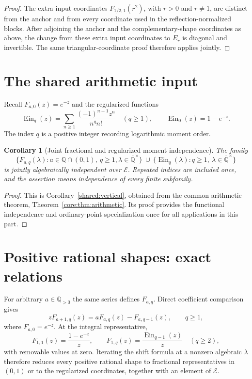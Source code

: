 \documentclass[11pt,a4paper]{article}
\newcommand{\Qbar}{\overline{\mathbb Q}}
\newcommand{\E}{\mathcal E}
\DeclareMathOperator{\Ein}{Ein}
\newtheorem{corollary}[theorem]{Corollary}
\theoremstyle{definition}
\theoremstyle{remark}
\numberwithin{equation}{section}
\begin{document}
\begin{proof}
The extra input coordinates \(F_{1/2,1}(r^2)\), with \(r>0\) and
\(r\ne1\), are distinct from the anchor and from every coordinate
used in the reflection-normalized blocks. After adjoining the anchor and
the complementary-shape coordinates as above, the change from these
extra input coordinates to \(E_r\) is diagonal and invertible.
The same triangular-coordinate proof therefore applies jointly.
\end{proof}



\section{The shared arithmetic input}\label{refl:sec:fractional-residue-proof}
Recall $F_{a,0}(z)=e^{-z}$ and the regularized functions
\[
 \Ein_q(z)=\sum_{n\ge1}\frac{(-1)^{n-1}z^n}{n^q n!}
 \quad(q\ge1),\qquad \Ein_0(z)=1-e^{-z}.
\]
The index $q$ is a positive integer recording logarithmic moment order.

\begin{corollary}[Joint fractional and regularized moment independence]
\label{refl:thm:joint-fractional-regularized}
The family
\[
 \{F_{a,q}(\lambda):a\in\mathbb Q\cap(0,1),\ q\ge1,
                       \lambda\in\Qbar^\times\}
 \ \cup\ 
 \{\Ein_q(\lambda):q\ge1,\ \lambda\in\Qbar^\times\}
\]
is jointly algebraically independent over $\E$. Repeated indices are
included once, and the assertion means independence of every finite
subfamily.
\end{corollary}
\begin{proof}
This is Corollary~\ref{shared:vertical}, obtained from the common
arithmetic theorem, Theorem~\ref{core:thm:arithmetic}. Its proof provides
the functional independence and ordinary-point specialization once for
all applications in this part.
\end{proof}

\section{Positive rational shapes: exact relations}\label{refl:sec:relations}

For arbitrary $a\in\mathbb Q_{>0}$ the same series defines $F_{a,q}$.
Direct coefficient comparison gives
\[
 zF_{a+1,q}(z)=aF_{a,q}(z)-F_{a,q-1}(z),\qquad q\geq1,
\]
where $F_{a,0}=e^{-z}$. At the integral representative,
\[
 F_{1,1}(z)=\frac{1-e^{-z}}z,
 \qquad F_{1,q}(z)=\frac{\Ein_{q-1}(z)}z\quad(q\geq2),
\]
with removable values at zero. Iterating the shift formula at a nonzero
algebraic $\lambda$ therefore reduces every positive rational shape
to fractional representatives in $(0,1)$ or to the regularized
coordinates, together with an element of $\E$.
\end{document}
